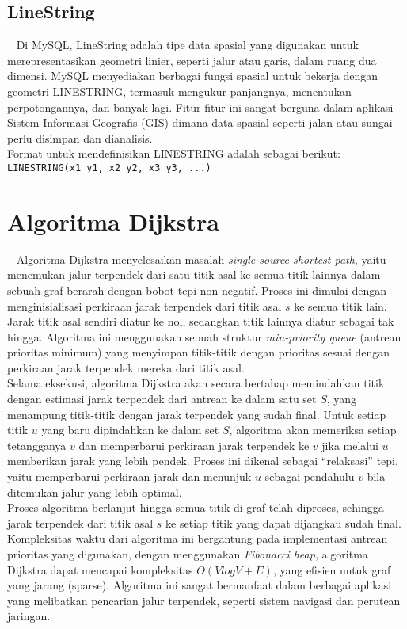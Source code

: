 \subsection{LineString}
\label{subs:linestring}
~\cite{oracle:24:mysql8.4}
Di MySQL, LineString adalah tipe data spasial yang digunakan untuk merepresentasikan geometri linier, seperti jalur atau garis, dalam ruang dua dimensi. MySQL menyediakan berbagai fungsi spasial untuk bekerja dengan geometri LINESTRING, termasuk mengukur panjangnya, menentukan perpotongannya, dan banyak lagi. Fitur-fitur ini sangat berguna dalam aplikasi Sistem Informasi Geografis (GIS) dimana data spasial seperti jalan atau sungai perlu disimpan dan dianalisis. \\
Format untuk mendefinisikan LINESTRING adalah sebagai berikut: \\
\texttt{LINESTRING(x1 y1, x2 y2, x3 y3, ...)}

\newpage

\section{Algoritma Dijkstra}
\label{sec:dijkstra}
~\cite{Cormen:09:intro}
Algoritma Dijkstra menyelesaikan masalah \textit{single-source shortest path}, yaitu menemukan jalur terpendek dari satu titik asal ke semua titik lainnya dalam sebuah graf berarah dengan bobot tepi non-negatif. Proses ini dimulai dengan menginisialisasi perkiraan jarak terpendek dari titik asal $s$ ke semua titik lain. Jarak titik asal sendiri diatur ke nol, sedangkan titik lainnya diatur sebagai tak hingga. Algoritma ini menggunakan sebuah struktur \textit{min-priority queue} (antrean prioritas minimum) yang menyimpan titik-titik dengan prioritas sesuai dengan perkiraan jarak terpendek mereka dari titik asal.
\\
Selama eksekusi, algoritma Dijkstra akan secara bertahap memindahkan titik dengan estimasi jarak terpendek dari antrean ke dalam satu set $S$, yang menampung titik-titik dengan jarak terpendek yang sudah final. Untuk setiap titik $u$ yang baru dipindahkan ke dalam set $S$, algoritma akan memeriksa setiap tetangganya $v$ dan memperbarui perkiraan jarak terpendek ke $v$ jika melalui $u$ memberikan jarak yang lebih pendek. Proses ini dikenal sebagai “relaksasi” tepi, yaitu memperbarui perkiraan jarak dan menunjuk $u$ sebagai pendahulu $v$ bila ditemukan jalur yang lebih optimal.
\\
Proses algoritma berlanjut hingga semua titik di graf telah diproses, sehingga jarak terpendek dari titik asal $s$ ke setiap titik yang dapat dijangkau sudah final. Kompleksitas waktu dari algoritma ini bergantung pada implementasi antrean prioritas yang digunakan, dengan menggunakan \textit{Fibonacci heap}, algoritma Dijkstra dapat mencapai kompleksitas $O(VlogV+E)$, yang efisien untuk graf yang jarang (sparse). Algoritma ini sangat bermanfaat dalam berbagai aplikasi yang melibatkan pencarian jalur terpendek, seperti sistem navigasi dan perutean jaringan.

